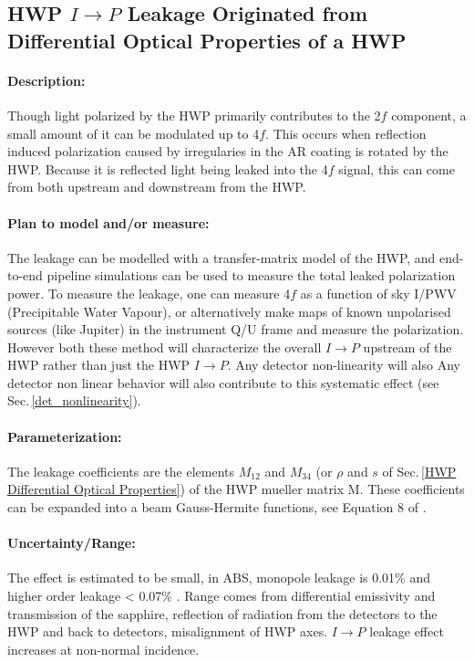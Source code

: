 \subsection{HWP $I \rightarrow P$ Leakage Originated from Differential Optical Properties of a HWP} 

\paragraph{Description:}
Though light polarized by the HWP primarily contributes to the 2$f$ component, a small amount of it can be modulated 
up to 4$f$.
This occurs when reflection induced polarization caused by irregularies in the AR coating is rotated by the HWP\cite{Essinger-Hileman2013, Essinger-Hileman2016, ABS_HWP}. 
Because it is reflected light being leaked into the 4$f$ signal, this can come from both upstream and downstream from the HWP.

\paragraph{Plan to model and/or measure:}
The leakage can be modelled with a transfer-matrix model of the HWP, and end-to-end pipeline simulations can be used to measure the total leaked polarization power.
To measure the leakage, one can measure 4$f$ as a function of sky I/PWV (Precipitable Water Vapour), or alternatively make maps of known unpolarised sources (like Jupiter) in the instrument Q/U frame
and measure the polarization. However both these method will characterize the overall $I \rightarrow P$ upstream of the HWP rather than just the HWP $I \rightarrow P$.
Any detector non-linearity will also Any detector non linear behavior will also contribute to this systematic effect (see Sec.\,\ref{det_nonlinearity}). 


\paragraph{Parameterization:}
The leakage coefficients are the elements $M_{12}$ and $M_{34}$ (or $\rho$ and $s$ of Sec.\,\ref{HWP Differential Optical Properties}) of the HWP mueller matrix M. These coefficients can be expanded into a beam Gauss-Hermite functions, 
see Equation 8 of \cite{Essinger-Hileman2016}. 

\paragraph{Uncertainty/Range:}
The effect is estimated to be small, in ABS, monopole leakage is 0.01\% and higher order leakage < 0.07\% \cite{Essinger-Hileman2016}.
Range comes from differential emissivity and transmission of the sapphire, reflection of radiation from the detectors to the HWP and back to detectors, 
misalignment of HWP axes. $I \rightarrow P$ leakage effect increases at non-normal incidence.
